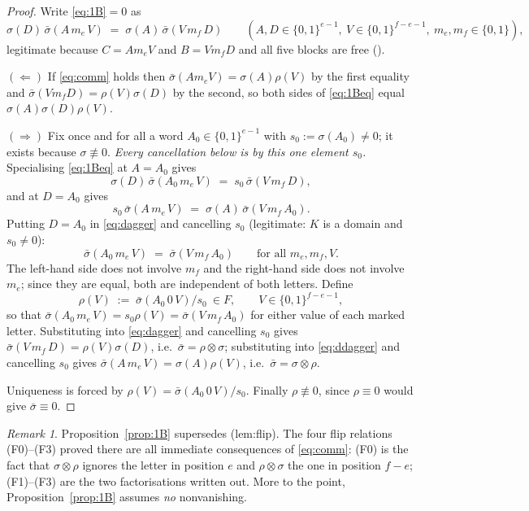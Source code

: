 \documentclass[11pt]{article}
\theoremstyle{definition}
\theoremstyle{remark}
\newtheorem{remark}[theorem]{Remark}
\begin{document}
\begin{proof}
Write \eqref{eq:1B}$=0$ as
\begin{equation}\label{eq:1Beq}
  \sigma(D)\,\bar\sigma(A\,m_e\,V)\;=\;\sigma(A)\,\bar\sigma(V\,m_f\,D)
  \qquad (A,D\in\{0,1\}^{e-1},\ V\in\{0,1\}^{f-e-1},\ m_e,m_f\in\{0,1\}),
\end{equation}
legitimate because $C=A m_e V$ and $B=V m_f D$ and all five blocks are free
(\cite[Lemma 3.1]{Q149}).

$(\Leftarrow)$ If \eqref{eq:comm} holds then $\bar\sigma(A m_e V)=\sigma(A)\rho(V)$ by the
first equality and $\bar\sigma(V m_f D)=\rho(V)\sigma(D)$ by the second, so both sides of
\eqref{eq:1Beq} equal $\sigma(A)\sigma(D)\rho(V)$.

$(\Rightarrow)$ Fix once and for all a word $A_0\in\{0,1\}^{e-1}$ with
$s_0:=\sigma(A_0)\neq0$; it exists because $\sigma\not\equiv0$.  \emph{Every cancellation
below is by this one element $s_0$.}
Specialising \eqref{eq:1Beq} at $A=A_0$ gives
\begin{equation}\label{eq:dagger}
  \sigma(D)\,\bar\sigma(A_0\,m_e\,V)\;=\;s_0\,\bar\sigma(V\,m_f\,D) ,
\end{equation}
and at $D=A_0$ gives
\begin{equation}\label{eq:ddagger}
  s_0\,\bar\sigma(A\,m_e\,V)\;=\;\sigma(A)\,\bar\sigma(V\,m_f\,A_0).
\end{equation}
Putting $D=A_0$ in \eqref{eq:dagger} and cancelling $s_0$ (legitimate: $K$ is a domain and
$s_0\ne0$):
\[
   \bar\sigma(A_0\,m_e\,V)\;=\;\bar\sigma(V\,m_f\,A_0)\qquad\text{for all }m_e,m_f,V .
\]
The left-hand side does not involve $m_f$ and the right-hand side does not involve $m_e$;
since they are equal, both are independent of both letters.  Define
\[
  \rho(V)\;:=\;\bar\sigma(A_0\,0\,V)/s_0\ \in F,\qquad V\in\{0,1\}^{f-e-1},
\]
so that $\bar\sigma(A_0\,m_e\,V)=s_0\rho(V)=\bar\sigma(V\,m_f\,A_0)$ for either value of
each marked letter.  Substituting into \eqref{eq:dagger} and cancelling $s_0$ gives
$\bar\sigma(V\,m_f\,D)=\rho(V)\sigma(D)$, i.e.\ $\bar\sigma=\rho\otimes\sigma$; substituting
into \eqref{eq:ddagger} and cancelling $s_0$ gives $\bar\sigma(A\,m_e\,V)=\sigma(A)\rho(V)$,
i.e.\ $\bar\sigma=\sigma\otimes\rho$.

Uniqueness is forced by $\rho(V)=\bar\sigma(A_0\,0\,V)/s_0$.  Finally $\rho\not\equiv0$,
since $\rho\equiv0$ would give $\bar\sigma\equiv0$.
\end{proof}

\begin{remark}
Proposition~\ref{prop:1B} supersedes \cite[Lemma 8.1]{Q149} (\textsf{lem:flip}).  The four
flip relations (F0)--(F3) proved there are all immediate consequences of \eqref{eq:comm}:
(F0) is the fact that $\sigma\otimes\rho$ ignores the letter in position $e$ and
$\rho\otimes\sigma$ the one in position $f-e$; (F1)--(F3) are the two factorisations written
out.  More to the point, Proposition~\ref{prop:1B} assumes \emph{no} nonvanishing.
\end{remark}
\end{document}
